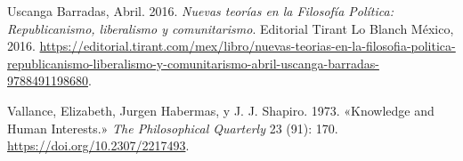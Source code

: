 \documentclass[
  letterpaper,
  DIV=11,
  numbers=noendperiod]{scrreprt}
\newlength{\cslhangindent}
\newenvironment{CSLReferences}[2] %
 {\begin{list}{}{%
  \setlength{\itemindent}{0pt}
  \setlength{\leftmargin}{0pt}
  \setlength{\parsep}{0pt}
  \ifodd #1
   \setlength{\leftmargin}{\cslhangindent}
   \setlength{\itemindent}{-1\cslhangindent}
  \fi
  \setlength{\itemsep}{#2\baselineskip}}}
 {\end{list}}
\begin{document}
\begin{CSLReferences}{1}{1}
Uscanga Barradas, Abril. 2016. \emph{Nuevas teorías en la Filosofía
Política: Republicanismo, liberalismo y comunitarismo}. Editorial Tirant
Lo Blanch México, 2016.
\url{https://editorial.tirant.com/mex/libro/nuevas-teorias-en-la-filosofia-politica-republicanismo-liberalismo-y-comunitarismo-abril-uscanga-barradas-9788491198680}.

Vallance, Elizabeth, Jurgen Habermas, y J. J. Shapiro. 1973. {«Knowledge
and Human Interests.»} \emph{The Philosophical Quarterly} 23 (91): 170.
\url{https://doi.org/10.2307/2217493}.

\end{CSLReferences}
\end{document}
